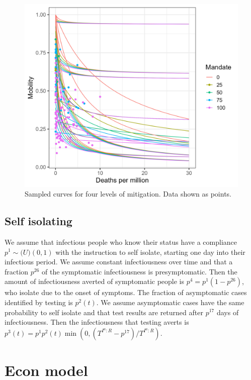 \documentclass[
]{article}
\begin{document}
\begin{figure}
\includegraphics[width=29.11in]{README_files/figure-gfm/mobilitycurves} \caption{Sampled curves for four levels of mitigation. Data shown as points.}\label{fig:mobilitycurves}
\end{figure}

\hypertarget{self-isolating}{%
\subsection{Self isolating}\label{self-isolating}}

We assume that infectious people who know their status have a compliance \(p^1\sim\mathcal(U)(0,1)\) with the instruction to self isolate, starting one day into their infectious period. We assume constant infectiousness over time and that a fraction \(p^{26}\) of the symptomatic infectiousness is presymptomatic. Then the amount of infectiousness averted of symptomatic people is \(p^4=p^1(1-p^{26})\), who isolate due to the onset of symptoms. The fraction of asymptomatic cases identified by testing is \(p^2(t)\). We assume asymptomatic cases have the same probability to self isolate and that test results are returned after \(p^{17}\) days of infectiousness. Then the infectiousness that testing averts is \(p^3(t)=p^1p^2(t)\min(0,(T^{I^a:R}-p^{17})/T^{I^a:R})\).

\hypertarget{econ-model}{%
\section{Econ model}\label{econ-model}}
\end{document}
